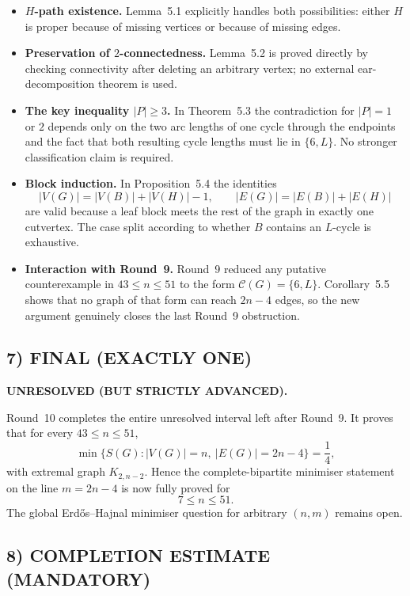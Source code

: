 \begin{itemize}
\item \textbf{$H$-path existence.} Lemma~5.1 explicitly handles both possibilities: either $H$ is proper because of missing vertices or because of missing edges.

\item \textbf{Preservation of $2$-connectedness.} Lemma~5.2 is proved directly by checking connectivity after deleting an arbitrary vertex; no external ear-decomposition theorem is used.

\item \textbf{The key inequality $|P|\ge 3$.} In Theorem~5.3 the contradiction for $|P|=1$ or $2$ depends only on the two arc lengths of one cycle through the endpoints and the fact that both resulting cycle lengths must lie in $\{6,L\}$. No stronger classification claim is required.

\item \textbf{Block induction.} In Proposition~5.4 the identities
\[
|V(G)|=|V(B)|+|V(H)|-1,
\qquad
|E(G)|=|E(B)|+|E(H)|
\]
are valid because a leaf block meets the rest of the graph in exactly one cutvertex. The case split according to whether $B$ contains an $L$-cycle is exhaustive.

\item \textbf{Interaction with Round~9.} Round~9 reduced any putative counterexample in $43\le n\le 51$ to the form $\mathcal C(G)=\{6,L\}$. Corollary~5.5 shows that no graph of that form can reach $2n-4$ edges, so the new argument genuinely closes the last Round~9 obstruction.
\end{itemize}

\subsection*{7) FINAL (EXACTLY ONE)}

\textbf{UNRESOLVED (BUT STRICTLY ADVANCED).}

Round~10 completes the entire unresolved interval left after Round~9. It proves that for every $43\le n\le 51$,
\[
\min\{S(G): |V(G)|=n,\ |E(G)|=2n-4\}=\frac14,
\]
with extremal graph $K_{2,n-2}$.
Hence the complete-bipartite minimiser statement on the line $m=2n-4$ is now fully proved for
\[
7\le n\le 51.
\]
The global Erd\H{o}s--Hajnal minimiser question for arbitrary $(n,m)$ remains open.

\subsection*{8) COMPLETION ESTIMATE (MANDATORY)}

